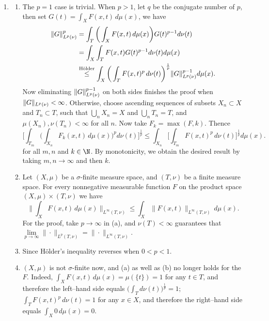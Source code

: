 \begin{enumerate}
\item[1.1.6.]
    \begin{enumerate}
    \item[(a)] The $p=1$ case is trivial. When $p > 1$, 
    let $q$ be the conjugate number of $p$, 
    then set $G(t)=\int_{X}F(x,t)\,d\mu(x)$, we have
    \begin{equation*}\begin{aligned}
    \Vert G \Vert_{L^{p}(\nu)}^{p}
    &=\int_{T}\bigg(\int_{X}F(x,t)\,d\mu(x)\bigg)G(t)^{p-1}d\nu(t)\\
    &=\int_{X}\int_{T}F(x,t)G(t)^{p-1}d\nu(t)d\mu(x)\\
    &\overset{\text{Hölder}}{\leq} 
    \int_{X}\bigg(\int_{T}F(x,t)^{p}\,d\nu(t)\bigg)^{\frac{1}{p}}\Vert G \Vert_{L^{p}(\nu)}^{p-1}d\mu(x).
    \end{aligned}\end{equation*}
    Now eliminating $\Vert G \Vert_{L^{p}(\nu)}^{p-1}$ on both sides 
    finishes the proof when $\Vert G \Vert_{L^{p}(\nu)}<\infty$. 
    Otherwise, choose ascending sequences of subsets $X_{n} \subset X$ and $T_{n} \subset T$, 
    such that $\bigcup_{n}X_{n}=X$ and $\bigcup_{n}T_{n}=T$, 
    and $\mu(X_{n}),\nu(T_{n})<\infty$ for all $n$. 
    Now take $F_{k}=\max(F,k)$. Thence
    \[\bigg[\int_{T_{m}}\bigg(\int_{X_{n}}F_{k}(x,t)\,d\mu(x)\bigg)^{p}d\nu(t)\bigg]^{\frac{1}{p}} 
    \leq 
    \int_{X_{n}}\bigg[\int_{T_{m}}F(x,t)^{p}\,d\nu(t)\bigg]^{\frac{1}{p}}d\mu(x).\]
    for all $m,n$ and $k \in \N$. By monotonicity, 
    we obtain the desired result by taking $m,n \to \infty$ and then $k$.
    
    \item[(b)] Let $(X,\mu)$ be a $\sigma$-finite measure space, 
    and $(T,\nu)$ be a finite measure space. 
    For every nonnegative measurable function $F$ 
    on the product space $(X,\mu)\times(T,\nu)$ we have
    \[\bigg\|\int_XF(x,t)\,d\mu(x)\bigg\|_{L^\infty(T,\nu)}
    \le\int_X\|F(x,t)\|_{L^\infty(T,\nu)}\,d\mu(x).\]
    For the proof, take $p\to\infty$ in (a), and $\nu(T)<\infty$ guarantees 
    that $\lim\limits_{p\to\infty}\|\cdot\|_{L^p(T,\nu)}=\|\cdot\|_{L^\infty(T,\nu)}$.
    
    \item[(c)] Since Hölder's inequality reverses when $0<p<1$.
    
    \item[(d)] $(X,\mu)$ is not $\sigma$-finite now, 
    and (a) as well as (b) no longer holds for the $F$. 
    Indeed, $\int_XF(x,t)\,d\mu(x)=\mu(\{t\})=1$ for any $t\in T$, 
    and therefore the left--hand side equals 
    $\Big(\int_Td\nu(t)\Big)^{\frac1p}=1$; 
    $\int_TF(x,t)^p\,d\nu(t)=1$ for any $x\in X$, 
    and therefore the right--hand side equals $\int_X0\,d\mu(x)=0$.
\end{enumerate}


\end{enumerate}
